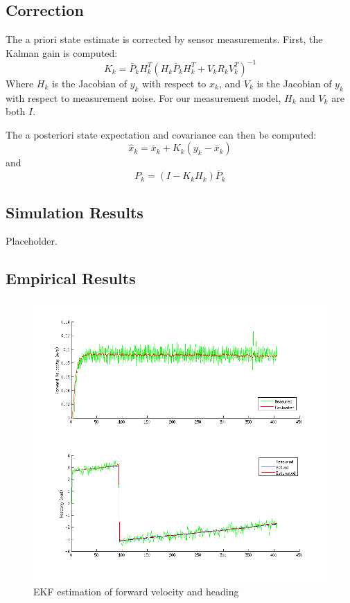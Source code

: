\documentclass[11pt]{article} %
\begin{document}
\subsection{Correction}

The a priori state estimate is corrected by sensor measurements.  First, the Kalman gain is computed:
\begin{equation}
K_k = \bar{P}_k H_k^T ( H_k \bar{P}_k H_k^T + V_k R_k V_k^T ) ^{-1}
\end{equation}
Where $H_k$ is the Jacobian of $y_k$ with respect to $x_k$, and $V_k$ is the Jacobian of $y_k$ with respect to measurement noise.   For our measurement model, $H_k$ and $V_k$ are both $I$.

The a posteriori state expectation and covariance can then be computed:
\begin{equation}
\hat{x}_k = \bar{x}_k + K_k (y_k - \bar{x}_k)
\end{equation}
and
\begin{equation}
P_k = (I - K_k H_k) \bar{P}_k
\end{equation}

\subsection{Simulation Results}

Placeholder.

\subsection{Empirical Results}

\begin{figure} [hbt]
 \centering
 \includegraphics[scale=0.60]{ekf_meas_vh.png} 
 \caption{EKF estimation of forward velocity and heading}
 \label{ekf_m_vh}
\end{figure}
\end{document}
